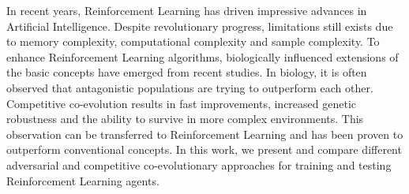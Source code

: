 In recent years, Reinforcement Learning has driven impressive advances in Artificial Intelligence. Despite revolutionary progress, limitations still exists due to memory complexity, computational complexity and sample complexity. To enhance Reinforcement Learning algorithms, biologically influenced extensions of the basic concepts have emerged from recent studies. In biology, it is often observed that antagonistic populations are trying to outperform each other. Competitive co-evolution results in fast improvements, increased genetic robustness and the ability to survive in more complex environments. This observation can be transferred to Reinforcement Learning and has been proven to outperform conventional concepts. In this work, we present and compare different adversarial and competitive co-evolutionary approaches for training and testing Reinforcement Learning agents.